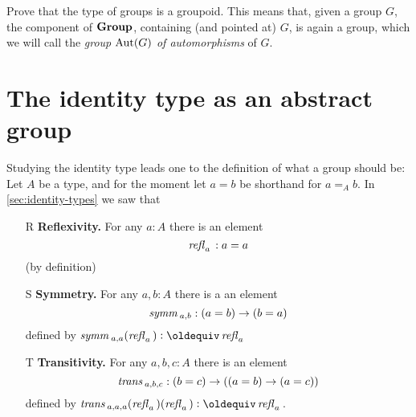   \begin{xca}\label{xca:typegroupisgroupoid}
    Prove that the type of groups is a groupoid.  This means that, given a group $G$, the component of $\mathbf{Group}$, containing (and pointed at) $G$, is again a group, which we will call the \emph{group $\mathrm{Aut}(G)$ of automorphisms} of $G$.
  \end{xca}

\section{The identity type as an abstract group }
\label{sec:identity-type-as-abstract}

Studying the identity type leads one to the definition of what a group should be:
Let $A$ be a type, and for the moment let $a=b$ be shorthand for $a=_Ab$.  In \cref{sec:identity-types} we saw that
\begin{enumerate}
\item[R] {\bf Reflexivity.} For any $a:A$ there is an element
$$\mathop{{\it refl}_{a}}{}:a=a$$ (by definition)
\item[S] {\bf Symmetry.} For any $a,b:A$ there is a an element $$\mathop{\mathit{symm}}{}_{a,b}:(a=b)\to (b=a)$$ defined by $\symm{}_{a,a}(\refl a{})\defequi\refl a{}$
\item[T] {\bf Transitivity.} For any $a,b,c:A$ there is an element $$\mathop{\mathit{trans}}{}_{a,b,c}:(b=c)\to((a=b)\to(a=c))$$ defined by $\trans{}_{a,a,a}(\refl a{})(\refl a{})\defequi \refl a{}$.
\end{enumerate}

